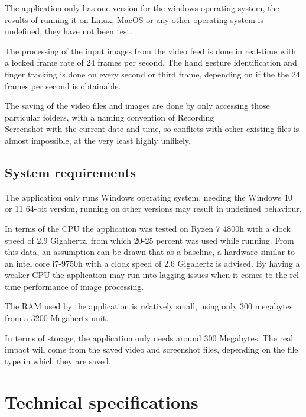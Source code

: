 \par The application only has one version for the windows operating system, the results of running it on Linux, MacOS or any other operating system is undefined, they have not been test.
\par The processing of the input images from the video feed is done in real-time with a locked frame rate of 24 frames per second. The hand gesture identification and finger tracking is done on every second or third frame, depending on if the the 24 frames per second is obtainable.
\par The saving of the video files and images are done by only accessing those particular folders, with a naming convention of Recording\\Screenshot with the current date and time, so conflicts with other existing files is almost impossible, at the very least highly unlikely.

\subsection{System requirements}
\label{sec:specssec1subsec3}

\par The application only runs Windows operating system, needing the Windows 10 or 11 64-bit version, running on other versions may result in undefined behaviour.
\par In terms of the CPU the application was tested on Ryzen 7 4800h with a clock speed of 2.9 Gigahertz, from which 20-25 percent was used while running. From this data, an assumption can be drawn that as a baseline, a hardware similar to an intel core i7-9750h with a clock speed of 2.6 Gigahertz is advised. By having a weaker CPU the application may run into lagging issues when it comes to the rel-time performance of image processing.
\par The RAM used by the application is relatively small, using only 300 megabytes from a 3200 Megahertz unit.
\par In terms of storage, the application only needs around 300 Megabytes. The real impact will come from the saved video and screenshot files, depending on the file type in which they are saved.

\label{sec:specssec2}

\section{Technical specifications}
\label{sec:specssec2}

